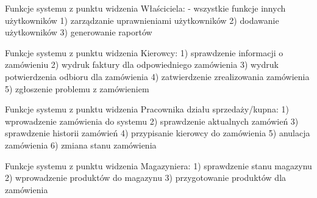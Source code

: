 
Funkcje systemu z punktu widzenia Właściciela:
	- wszystkie funkcje innych użytkowników
	1) zarządzanie uprawnieniami użytkowników
	2) dodawanie użytkowników
	3) generowanie raportów

Funkcje systemu z punktu widzenia Kierowcy:
	1) sprawdzenie informacji o zamówieniu
	2) wydruk faktury dla odpowiedniego zamówienia
	3) wydruk potwierdzenia odbioru dla zamówienia
	4) zatwierdzenie zrealizowania zamówienia
	5) zgłoszenie problemu z zamówieniem

Funkcje systemu z punktu widzenia Pracownika działu sprzedaży/kupna:
	1) wprowadzenie zamówienia do systemu
	2) sprawdzenie aktualnych zamówień
	3) sprawdzenie historii zamówień
	4) przypisanie kierowcy do zamówienia
	5) anulacja zamówienia
	6) zmiana stanu zamówienia

Funkcje systemu z punktu widzenia Magazyniera:
	1) sprawdzenie stanu magazynu 
	2) wprowadzenie produktów do magazynu
	3) przygotowanie produktów dla zamówienia
